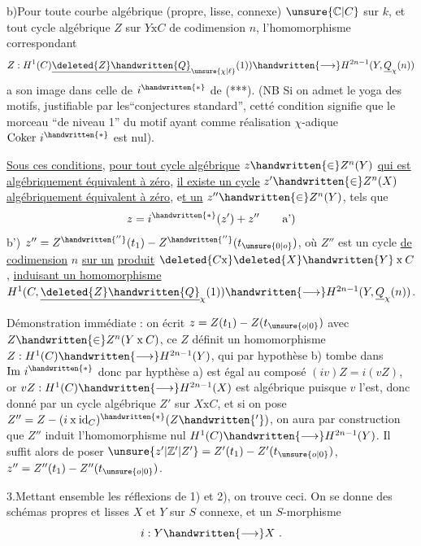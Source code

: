 b)\quad Pour toute courbe algébrique (propre, lisse, connexe) $\unsure{\mathbb{C}|C}$ sur $k$, et tout cycle algébrique $Z$ sur $Y\mathbin{\mathrm{x}}C$ de codimension $n$, l'homomorphisme correspondant
\[
Z:H^1(C)\underline{\deleted{Z}\handwritten{Q}}_{\unsure{\chi|\ell}}(1))\handwritten{\longrightarrow}H^{2n-1}(Y,\underline{Q}_{\chi}(n))
\]
a son image dans celle de $i^{\handwritten{*}}$ de (***). (NB Si on admet le yoga des motifs, justifiable par les``conjectures standard'', cetté condition signifie que le  morceau  ``de niveau 1'' du motif  ayant comme réalisation $\chi$-adique $\mathrm{Coker}\ i^{\handwritten{*}}$ est nul).

\uline{Sous ces conditions}, \uline{pour tout cycle algébrique} $z\handwritten{\in}Z^n(Y)$ \uline{qui est algébriquement équivalent à zéro}, \uline{il existe un cycle} $z'\handwritten{\in}Z^n(X)$ \uline{algébriquement équivalent à zéro}, e\uline{t un} $z''\handwritten{\in}Z^n(Y)$, tels que
\[
z=i^{\handwritten{*}}(z')+z''\tag*{a')}
\]
b')\quad {} $z''=Z^{\handwritten{''}}(t_1)-Z^{\handwritten{''}}(t_{\unsure{0|o}})$, où $Z''$ est un cycle \uline{de codimension} $n$ \uline{sur un} \uline{produit} $\deleted{C\mathrm{x}}\deleted{X}\handwritten{Y}\mathbin{\mathrm{x}}C$, \uline{induisant un homomorphisme}   $H^1(C,\underline{\deleted{Z}\handwritten{Q}}_{\chi}(1))\handwritten{\longrightarrow}H^{2n-1}(Y,\underline{Q}_{\chi}(n))$.

Démonstration immédiate : on écrit $z=Z(t_1)-Z(t_{\unsure{o|0}})$ avec $Z\handwritten{\in}Z^n(Y\mathbin{\mathrm{x}}C)$, ce $Z$ définit un homomorphisme $Z:H^1(C)\handwritten{\longrightarrow}H^{2n-1}(Y)$,  qui par hypothèse b) tombe dans $\mathrm{Im}\ i^{\handwritten{*}}$ donc par hypthèse a) est égal au composé $(iv)Z=i(vZ)$, or $vZ:H^1(C)\handwritten{\longrightarrow}H^{2n-1}(X)$ est algébrique puisque $v$ l'est, donc donné par un cycle algébrique $Z'$ sur $X\mathbin{\mathrm{x}}C$, et si on pose $Z''=Z-(i\mathbin{\mathrm{x}}\mathrm{id}_C)^{\handwritten{*}}(Z\handwritten{'} )$, on aura par construction que $Z''$ induit l'homomorphisme nul $H^1(C)\handwritten{\longrightarrow}H^{2n-1}(Y)$.  Il suffit alors de poser $\unsure{z'|\mathbb{Z}'|Z'}=Z'(t_1)-Z'(t_{\unsure{o|0}})$, $z''=Z''(t_1)-Z''(t_{\unsure{o|0}})$.

3.\quad Mettant ensemble les réflexions de 1) et 2), on trouve ceci. On se donne des schémas propres et lisses $X$ et $Y$ sur $S$  connexe, et un $S$-morphisme
\[
i:Y\handwritten{\longrightarrow}X\ .
\]
